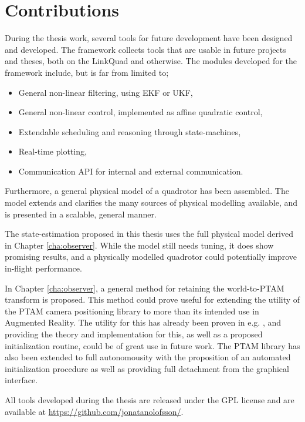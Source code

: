 \section{Contributions}
    During the thesis work, several tools for future development have been
    designed and developed. The \crap framework collects tools that are usable in future
    projects and theses, both on the LinkQuad and otherwise.
    The modules developed for the \crap framework include, but is far from limited to;
    \begin{itemize}
        \item General non-linear filtering, using EKF or UKF,
        \item General non-linear control, implemented as affine quadratic control,
        \item Extendable scheduling and reasoning through state-machines,
        \item Real-time plotting,
        \item Communication API for internal and external communication.
    \end{itemize}

    Furthermore, a general physical model of a quadrotor has been assembled.
    The model extends and clarifies the many sources of physical modelling
    available, and is presented in a scalable, general manner.

    The state-estimation proposed in this thesis uses the full physical model
    derived in Chapter \ref{cha:observer}. While the model still needs
    tuning, it does show promising results, and a physically modelled
    quadrotor could potentially improve in-flight performance.

    In Chapter \ref{cha:observer}, a general method for retaining
    the world-to-PTAM transform is proposed.
    This method could prove useful for extending the utility of the PTAM
    camera positioning library to more than its intended use in Augmented Reality.
    The utility for this has already been proven in e.g. \citep{weiss11monocular},
    and providing the theory and implementation for this, as well as a proposed
    initialization routine, could be of great use in future work.
    The PTAM library has also been extended to full autonomousity with the
    proposition of an automated initialization procedure as well as providing
    full detachment from the graphical interface.

    All tools developed during the thesis are released under the GPL license
    and are available at \url{https://github.com/jonatanolofsson/}.

